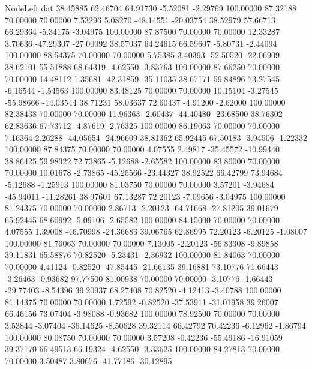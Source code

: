\begin{filecontents}{NodeLeft.dat}
  38.45885   62.46704   64.91730    -5.52081   -2.29769  100.00000   87.32188   70.00000   70.00000    7.53296    5.08270  -48.14551  -20.03754
  38.52979   57.66713   66.29364    -5.34175   -3.04975  100.00000   87.87500   70.00000   70.00000   12.33287    3.70636  -47.29307  -27.00092
  38.57037   64.24615   66.59607    -5.80731   -2.44094  100.00000   88.54375   70.00000   70.00000    5.75385    3.40393  -52.50520  -22.06909
  38.62101   55.51888   68.64319    -4.62550   -3.83763  100.00000   87.66250   70.00000   70.00000   14.48112    1.35681  -42.31859  -35.11035
  38.67171   59.84896   73.27545    -6.16544   -1.54563  100.00000   83.48125   70.00000   70.00000   10.15104   -3.27545  -55.98666  -14.03544
  38.71231   58.03637   72.60437    -4.91200   -2.62000  100.00000   82.38438   70.00000   70.00000   11.96363   -2.60437  -44.40480  -23.68500
  38.76302   62.83636   67.73712    -4.87619   -2.76325  100.00000   86.19063   70.00000   70.00000    7.16364    2.26288  -44.05654  -24.96609
  38.81362   65.92445   67.50183    -3.94506   -1.22332  100.00000   87.84375   70.00000   70.00000    4.07555    2.49817  -35.45572  -10.99440
  38.86425   59.98322   72.73865    -5.12688   -2.65582  100.00000   83.80000   70.00000   70.00000   10.01678   -2.73865  -45.25566  -23.44327
  38.92522   66.42799   73.94684    -5.12688   -1.25913  100.00000   81.03750   70.00000   70.00000    3.57201   -3.94684  -45.94011  -11.28261
  38.97601   67.13287   72.20123    -7.09656   -3.04975  100.00000   81.24375   70.00000   70.00000    2.86713   -2.20123  -64.71668  -27.81205
  39.01679   65.92445   68.60992    -5.09106   -2.65582  100.00000   84.15000   70.00000   70.00000    4.07555    1.39008  -46.70998  -24.36683
  39.06765   62.86995   72.20123    -6.20125   -1.08007  100.00000   81.79063   70.00000   70.00000    7.13005   -2.20123  -56.83308   -9.89858
  39.11831   65.58876   70.82520    -5.23431   -2.36932  100.00000   81.84063   70.00000   70.00000    4.41124   -0.82520  -47.85445  -21.66135
  39.16881   73.10776   71.66443    -3.26463   -0.93682   97.77500   81.00938   70.00000   70.00000   -3.10776   -1.66443  -29.77403   -8.54396
  39.20937   68.27408   70.82520    -4.12413   -3.40788  100.00000   81.14375   70.00000   70.00000    1.72592   -0.82520  -37.53911  -31.01958
  39.26007   66.46156   73.07404    -3.98088   -0.93682  100.00000   78.92500   70.00000   70.00000    3.53844   -3.07404  -36.14625   -8.50628
  39.32114   66.42792   70.42236    -6.12962   -1.86794  100.00000   80.08750   70.00000   70.00000    3.57208   -0.42236  -55.49186  -16.91059
  39.37170   66.49513   66.19324    -4.62550   -3.33625  100.00000   84.27813   70.00000   70.00000    3.50487    3.80676  -41.77186  -30.12895

\end{filecontents}
